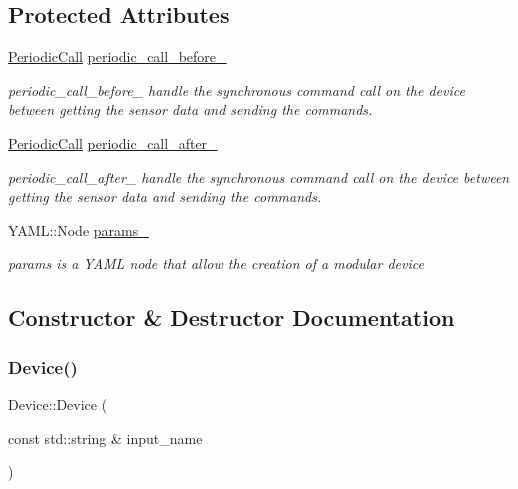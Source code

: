 \subsection*{Protected Attributes}
\begin{DoxyCompactItemize}
\item 
\hyperlink{classdynamic__graph_1_1PeriodicCall}{Periodic\+Call} \hyperlink{classdynamic__graph_1_1Device_afe6456e2d14701498bde6ed74fb0526a}{periodic\+\_\+call\+\_\+before\+\_\+}
\begin{DoxyCompactList}\small\item\em periodic\+\_\+call\+\_\+before\+\_\+ handle the {\itshape synchronous} command call on the device between getting the sensor data and sending the commands. \end{DoxyCompactList}\item 
\hyperlink{classdynamic__graph_1_1PeriodicCall}{Periodic\+Call} \hyperlink{classdynamic__graph_1_1Device_aa2ff18a40858856c9be43b2d609d63ab}{periodic\+\_\+call\+\_\+after\+\_\+}
\begin{DoxyCompactList}\small\item\em periodic\+\_\+call\+\_\+after\+\_\+ handle the {\itshape synchronous} command call on the device between getting the sensor data and sending the commands. \end{DoxyCompactList}\item 
\mbox{\label{classdynamic__graph_1_1Device_a9dc0a118c20e33194463eff1c18ce247}} 
Y\+A\+M\+L\+::\+Node \hyperlink{classdynamic__graph_1_1Device_a9dc0a118c20e33194463eff1c18ce247}{params\+\_\+}
\begin{DoxyCompactList}\small\item\em params is a Y\+A\+ML node that allow the creation of a modular device \end{DoxyCompactList}\end{DoxyCompactItemize}


\subsection{Constructor \& Destructor Documentation}
\mbox{\label{classdynamic__graph_1_1Device_a76c80f6d47e2151494e375e2faf78c0d}} 
\subsubsection{\texorpdfstring{Device()}{Device()}}
{\footnotesize\ttfamily Device\+::\+Device (\begin{DoxyParamCaption}\item[{const std\+::string \&}]{input\+\_\+name }\end{DoxyParamCaption})}



